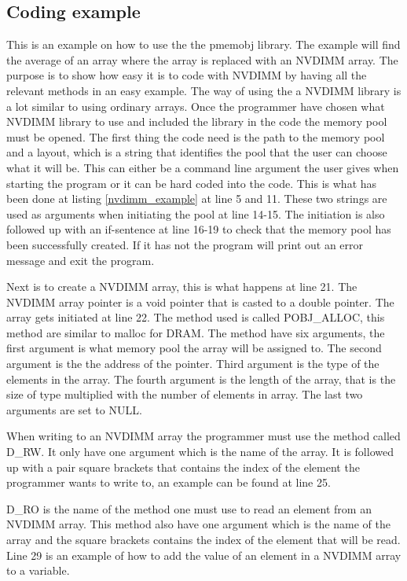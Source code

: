 \documentclass[12pt,a4paper,USenglish]{article}      %
\begin{document}
\subsection{Coding example}
This is an example on how to use the the pmemobj library. The example will find the average of an array where the array is replaced with an NVDIMM array. The purpose is to show how easy it is to code with NVDIMM by having all the relevant methods in an easy example.
The way of using the a NVDIMM library is a lot similar to using ordinary arrays. Once the programmer have chosen what NVDIMM library to use and included the library in the code the memory pool must be opened. The first thing the code need is the path to the memory pool and a layout, which is a string that identifies the pool that the user can choose what it will be. This can either be a command line argument the user gives when starting the program or it can be hard coded into the code. This is what has been done at listing \ref{nvdimm_example} at line 5 and 11. These two strings are used as arguments when initiating the pool at line 14-15. The initiation is also followed up with an if-sentence at line 16-19 to check that the memory pool has been successfully created. If it has not the program will print out an error message and exit the program.

Next is to create a NVDIMM array, this is what happens at line 21. The NVDIMM array pointer is a void pointer that is casted to a double pointer. 
The array gets initiated at line 22. The method used is called POBJ\_ALLOC, this method are similar to malloc for DRAM. The method have six arguments, the first argument is what memory pool the array will be assigned to.
The second argument is the the address of the pointer. Third argument is the type of the elements in the array. The fourth argument is the length of the array, that is the size of type multiplied with the number of elements in array. The last two arguments are set to NULL.

When writing to an NVDIMM array the programmer must use the method called D\_RW. It only have one argument which is the name of the array. It is followed up with a pair square brackets that contains the index of the element the programmer wants to write to, an example can be found at line 25.

D\_RO is the name of the method one must use to read an element from an NVDIMM array. This method also have one argument which is the name of the array and the square brackets contains the index of the element that will be read. Line 29 is an example of how to add the value of an element in a NVDIMM array to a variable.
\end{document}
